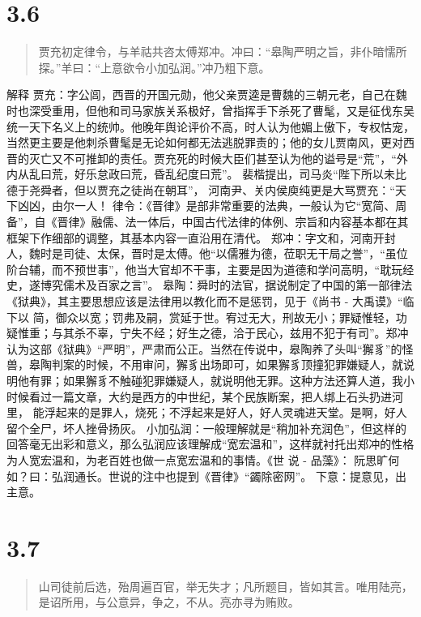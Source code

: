 \documentclass[]{book}
\begin{document}
\section{3.6}\label{section-160}

\begin{quote}
贾充初定律令，与羊祜共咨太傅郑冲。冲曰：``皋陶严明之旨，非仆暗懦所探。''羊曰：``上意欲令小加弘润。''冲乃粗下意。
\end{quote}

解释
贾充：字公闾，西晋的开国元勋，他父亲贾逵是曹魏的三朝元老，自己在魏时也深受重用，但他和司马家族关系极好，曾指挥手下杀死了曹髦，又是征伐东吴统一天下名义上的统帅。他晚年舆论评价不高，时人认为他媚上傲下，专权怙宠，当然更主要是他刺杀曹髦是无论如何都无法逃脱罪责的；他的女儿贾南风，更对西晋的灭亡又不可推卸的责任。贾充死的时候大臣们甚至认为他的谥号是``荒''，``外内从乱曰荒，好乐怠政曰荒，昏乱纪度曰荒''。
裴楷提出，司马炎``陛下所以未比德于尧舜者，但以贾充之徒尚在朝耳''，
河南尹、关内侯庾纯更是大骂贾充：``天下凶凶，由尔一人！
律令：《晋律》是部非常重要的法典，一般认为它``宽简、周备''，自《晋律》融儒、法一体后，中国古代法律的体例、宗旨和内容基本都在其框架下作细部的调整，其基本内容一直沿用在清代。
郑冲：字文和，河南开封人，魏时是司徒、太保，晋时是太傅。他``以儒雅为德，莅职无干局之誉''，``虽位阶台辅，而不预世事''，他当大官却不干事，主要是因为道德和学问高明，``耽玩经史，遂博究儒术及百家之言''。
皋陶：舜时的法官，据说制定了中国的第一部律法《狱典》，其主要思想应该是法律用以教化而不是惩罚，见于《尚书
- 大禹谟》``临下以
简，御众以宽；罚弗及嗣，赏延于世。宥过无大，刑故无小；罪疑惟轻，功疑惟重；与其杀不辜，宁失不经；好生之德，洽于民心，兹用不犯于有司''。郑冲认为这部《狱典》``严明''，严肃而公正。当然在传说中，皋陶养了头叫``獬豸''的怪兽，皋陶判案的时候，不用审问，獬豸出场即可，如果獬豸顶撞犯罪嫌疑人，就说明他有罪；如果獬豸不触碰犯罪嫌疑人，就说明他无罪。这种方法还算人道，我小时候看过一篇文章，大约是西方的中世纪，某个民族断案，把人绑上石头扔进河里，
能浮起来的是罪人，烧死；不浮起来是好人，好人灵魂进天堂。是啊，好人留个全尸，坏人挫骨扬灰。
小加弘润：一般理解就是``稍加补充润色''，但这样的回答毫无出彩和意义，那么弘润应该理解成``宽宏温和''，这样就衬托出郑冲的性格为人宽宏温和，为老百姓也做一点宽宏温和的事情。《世
说 - 品藻》：
阮思旷何如？曰：弘润通长。世说的注中也提到《晋律》``蠲除密网''。
下意：提意见，出主意。

\section{3.7}\label{section-161}

\begin{quote}
山司徒前后选，殆周遍百官，举无失才；凡所题目，皆如其言。唯用陆亮，是诏所用，与公意异，争之，不从。亮亦寻为贿败。
\end{quote}
\end{document}
